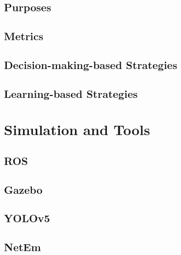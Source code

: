 \subsection{Purposes}
\subsection{Metrics}
\subsection{Decision-making-based Strategies}
\subsection{Learning-based Strategies}

\section{Simulation and Tools}
\subsection{ROS}
\subsection{Gazebo}
\subsection{YOLOv5}
\subsection{NetEm}
